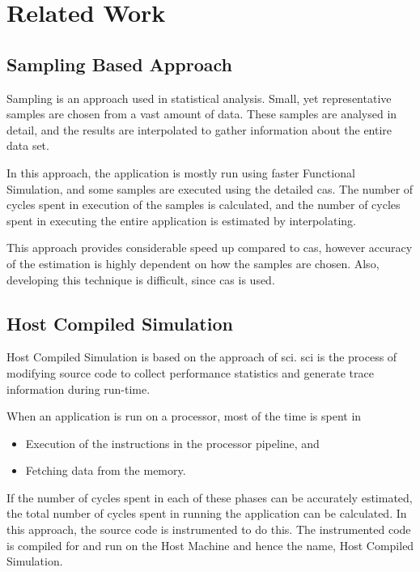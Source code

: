 \section{Related Work}

\subsection{Sampling Based Approach}
Sampling is an approach used in statistical analysis. Small, yet representative samples are chosen from a vast amount of data. These samples are analysed in detail, and the results are interpolated to gather information about the entire data set.

In this approach, the application is mostly run using faster Functional Simulation, and some samples are executed using the detailed \gls{cas}. The number of cycles spent in execution of the samples is calculated, and the number of cycles spent in executing the entire application is estimated by interpolating.

This approach provides considerable speed up compared to \gls{cas}, however accuracy of the estimation is highly dependent on how the samples are chosen. Also, developing this technique is difficult, since \gls{cas} is used.


\subsection{Host Compiled Simulation}
Host Compiled Simulation is based on the approach of \gls{sci}. \gls{sci} is the process of modifying source code to collect performance statistics and generate trace information during run-time. 

When an application is run on a processor, most of the time is spent in 
\begin{itemize} \itemsep -6pt
\item Execution of the instructions in the processor pipeline, and 
\item Fetching data from the memory. 
\end{itemize}

If the number of cycles spent in each of these phases can be accurately estimated, the total number of cycles spent in running the application can be calculated.  In this approach, the source code is instrumented to do this. The instrumented code is compiled for and run on the Host Machine and hence the name, Host Compiled Simulation.

